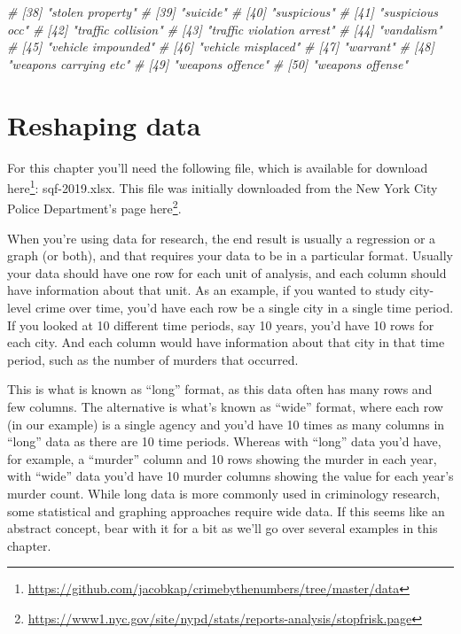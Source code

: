 \documentclass[
]{krantz}
\makeatletter
\newenvironment{Shaded}{\begin{snugshade}}{\end{snugshade}}
\newcommand{\CommentTok}[1]{\textcolor[rgb]{0.37,0.37,0.37}{\textit{#1}}}
\renewcommand{\href}[2]{#2\footnote{\url{#1}}}
\newenvironment{kframe}{%
\medskip{}
\setlength{\fboxsep}{.8em}
 \def\at@end@of@kframe{}%
 \ifinner\ifhmode%
  \def\at@end@of@kframe{\end{minipage}}%
  \begin{minipage}{\columnwidth}%
 \fi\fi%
 \def\FrameCommand##1{\hskip\@totalleftmargin \hskip-\fboxsep
 \colorbox{shadecolor}{##1}\hskip-\fboxsep
     \hskip-\linewidth \hskip-\@totalleftmargin \hskip\columnwidth}%
 \MakeFramed {\advance\hsize-\width
   \@totalleftmargin\z@ \linewidth\hsize
   \@setminipage}}%
 {\par\unskip\endMakeFramed%
 \at@end@of@kframe}
\renewenvironment{Shaded}{\begin{kframe}}{\end{kframe}}
\makeatother
\begin{document}
\begin{Shaded}
\begin{Highlighting}[]
\CommentTok{\# [38] "stolen property"                           }
\CommentTok{\# [39] "suicide"                                   }
\CommentTok{\# [40] "suspicious"                                }
\CommentTok{\# [41] "suspicious occ"                            }
\CommentTok{\# [42] "traffic collision"                         }
\CommentTok{\# [43] "traffic violation arrest"                  }
\CommentTok{\# [44] "vandalism"                                 }
\CommentTok{\# [45] "vehicle impounded"                         }
\CommentTok{\# [46] "vehicle misplaced"                         }
\CommentTok{\# [47] "warrant"                                   }
\CommentTok{\# [48] "weapons carrying etc"                      }
\CommentTok{\# [49] "weapons offence"                           }
\CommentTok{\# [50] "weapons offense"}
\end{Highlighting}
\end{Shaded}

\hypertarget{reshaping}{%
\chapter{Reshaping data}\label{reshaping}}

For this chapter you'll need the following file, which is
available for download
\href{https://github.com/jacobkap/crimebythenumbers/tree/master/data}{here}:
sqf-2019.xlsx. This file was initially downloaded from the
New York City Police Department's page
\href{https://www1.nyc.gov/site/nypd/stats/reports-analysis/stopfrisk.page}{here}.

When you're using data for research, the end result is
usually a regression or a graph (or both), and that requires
your data to be in a particular format. Usually your data
should have one row for each unit of analysis, and each
column should have information about that unit. As an
example, if you wanted to study city-level crime over time,
you'd have each row be a single city in a single time
period. If you looked at 10 different time periods, say 10
years, you'd have 10 rows for each city. And each column
would have information about that city in that time period,
such as the number of murders that occurred.

This is what is known as ``long'' format, as this data often
has many rows and few columns. The alternative is what's
known as ``wide'' format, where each row (in our example) is
a single agency and you'd have 10 times as many columns in
``long'' data as there are 10 time periods. Whereas with
``long'' data you'd have, for example, a ``murder'' column
and 10 rows showing the murder in each year, with ``wide''
data you'd have 10 murder columns showing the value for each
year's murder count. While long data is more commonly used
in criminology research, some statistical and graphing
approaches require wide data. If this seems like an abstract
concept, bear with it for a bit as we'll go over several
examples in this chapter.
\end{document}
